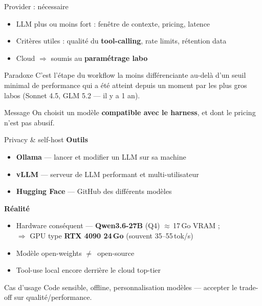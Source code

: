 \documentclass[aspectratio=169]{beamer}
\begin{document}
\begin{frame}{Provider : nécessaire}
    \begin{itemize}
        \item LLM plus ou moins fort : fenêtre de contexte, pricing, latence
        \item Critères utiles : qualité du \textbf{tool-calling}, rate limits, rétention data
        \item Cloud $\Rightarrow$ soumis au \textbf{paramétrage labo}
    \end{itemize}
    \vspace{0.4cm}
    \begin{alertblock}{Paradoxe}
        C'est l'étape du workflow la moins différenciante au-delà d'un seuil minimal de performance qui a été atteint depuis un moment par les plus gros labos (Sonnet 4.5, GLM 5.2 --- il y a 1 an).
    \end{alertblock}
    \vspace{0.3cm}
    \begin{block}{Message}
        On choisit un modèle \textbf{compatible avec le harness}, et dont le pricing n'est pas abusif. 
    \end{block}
\end{frame}

\begin{frame}{Privacy \& self-host}    
    \textbf{Outils}
    \begin{itemize}
        \item \textbf{Ollama} --- lancer et modifier un LLM sur sa machine
        \item \textbf{vLLM} --- serveur de LLM performant et multi-utilisateur  
        \item \textbf{Hugging Face} --- GitHub des différents modèles
    \end{itemize}
    \textbf{Réalité}
    \begin{itemize}
        \item Hardware conséquent --- \textbf{Qwen3.6-27B} (Q4) $\approx$\,17\,Go VRAM ; \\
              $\Rightarrow$ GPU type \textbf{RTX 4090 24\,Go} (souvent 35--55\,tok/s)
        \item Modèle open-weights $\neq$\ open-source
        \item Tool-use local encore derrière le cloud top-tier
    \end{itemize}

    \vspace{0.5cm}
    \begin{block}{Cas d'usage}
        Code sensible, offline, personnalisation modèles --- accepter le trade-off sur qualité/performance.
    \end{block}
\end{frame}
\end{document}
